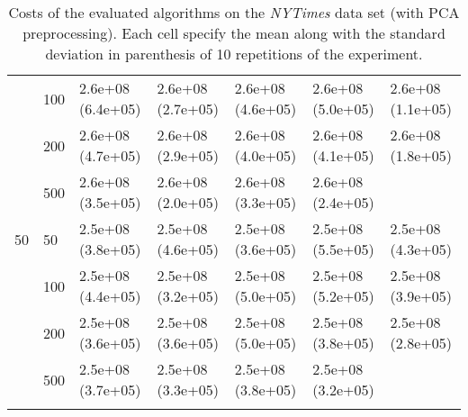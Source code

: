 \begin{longtable}{lllllll}
   & 100 &  2.6e+08 (6.4e+05) &  2.6e+08 (2.7e+05) &  2.6e+08 (4.6e+05) &    2.6e+08 (5.0e+05) &  2.6e+08 (1.1e+05) \\
   & 200 &  2.6e+08 (4.7e+05) &  2.6e+08 (2.9e+05) &  2.6e+08 (4.0e+05) &    2.6e+08 (4.1e+05) &  2.6e+08 (1.8e+05) \\
   & 500 &  2.6e+08 (3.5e+05) &  2.6e+08 (2.0e+05) &  2.6e+08 (3.3e+05) &    2.6e+08 (2.4e+05) &       \\
 \midrule
50 & 50  &  2.5e+08 (3.8e+05) &  2.5e+08 (4.6e+05) &  2.5e+08 (3.6e+05) &    2.5e+08 (5.5e+05) &  2.5e+08 (4.3e+05) \\
   & 100 &  2.5e+08 (4.4e+05) &  2.5e+08 (3.2e+05) &  2.5e+08 (5.0e+05) &    2.5e+08 (5.2e+05) &  2.5e+08 (3.9e+05) \\
   & 200 &  2.5e+08 (3.6e+05) &  2.5e+08 (3.6e+05) &  2.5e+08 (5.0e+05) &    2.5e+08 (3.8e+05) &  2.5e+08 (2.8e+05) \\
   & 500 &  2.5e+08 (3.7e+05) &  2.5e+08 (3.3e+05) &  2.5e+08 (3.8e+05) &    2.5e+08 (3.2e+05) &                 \\
\bottomrule
\caption{Costs of the evaluated algorithms on the \textit{NYTimes} data set (with PCA preprocessing). Each cell specify the mean along with the standard deviation in parenthesis of 10 repetitions of the experiment.}
\label{tab:real-cost-mean-std-nytimes-pca}
\end{longtable}

